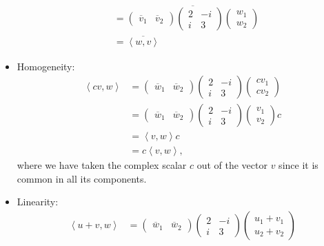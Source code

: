 \begin{questions}
\begin{solution}
\begin{itemize}
\begin{align*}
&=\overline{\begin{pmatrix}
\overline{v}_1&\overline{v}_2\end{pmatrix}\begin{pmatrix}
2&-i\\i&3\end{pmatrix}\begin{pmatrix}
w_1\\w_2
\end{pmatrix}}\\
&=\overline{\left\langle w,v\right\rangle}
\end{align*}
\item Homogeneity:
\begin{align*}
\left<cv,w\right>&=\begin{pmatrix}
\overline{w}_1&\overline{w}_2
\end{pmatrix}\begin{pmatrix}
2&-i\\i&3
\end{pmatrix}\begin{pmatrix}
cv_1\\cv_2
\end{pmatrix}\\
&=\begin{pmatrix}
\overline{w}_1&\overline{w}_2
\end{pmatrix}\begin{pmatrix}
2&-i\\i&3
\end{pmatrix}\begin{pmatrix}
v_1\\v_2
\end{pmatrix}c\\
&=\left<v,w\right>c\\
&=c\left<v,w\right>,
\end{align*}
where we have taken the complex scalar $c$ out of the vector $v$ since it is common in all its components.
\item Linearity: 
\begin{align*}
\left<u+v,w\right>&=\begin{pmatrix}
\overline{w}_1&\overline{w}_2
\end{pmatrix}\begin{pmatrix}
2&-i\\i&3
\end{pmatrix}\begin{pmatrix}
u_1+v_1\\u_2+v_2
\end{pmatrix}\\

\end{align*}
\end{itemize}
\end{solution}
\end{questions}
